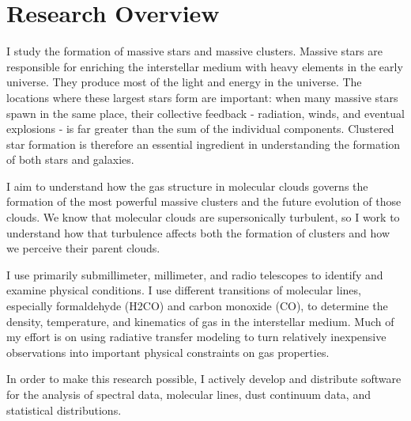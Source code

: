 \section*{Research Overview}
I study the formation of massive stars and massive clusters.  Massive stars are
responsible for enriching the interstellar medium with heavy elements in the
early universe.  They produce most of the light and energy in the universe.
The locations where these largest stars form are important: when many massive
stars spawn in the same place, their collective feedback - radiation, winds,
and eventual explosions - is far greater than the sum of the individual
components.  Clustered star formation is therefore an essential ingredient in
understanding the formation of both stars and galaxies.

I aim to understand how the gas structure in molecular clouds governs the
formation of the most powerful massive clusters and the future evolution of
those clouds.  We know that molecular clouds are supersonically turbulent, so I
work to understand how that turbulence affects both the formation of clusters
and how we perceive their parent clouds.

I use primarily submillimeter, millimeter, and radio telescopes to identify and
examine physical conditions.  I use different transitions of molecular lines,
especially formaldehyde (H2CO) and carbon monoxide (CO), to determine the
density, temperature, and kinematics of gas in the interstellar medium.
Much of my effort is on using radiative transfer modeling to turn relatively
inexpensive observations into important physical constraints on gas properties.

In order to make this research possible, I actively develop and distribute
software for the analysis of spectral data, molecular lines, dust continuum
data, and statistical distributions.

